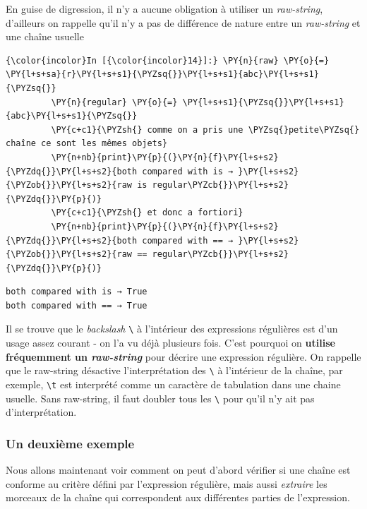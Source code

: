     En guise de digression, il n'y a aucune obligation à utiliser un
\emph{raw-string}, d'ailleurs on rappelle qu'il n'y a pas de différence
de nature entre un \emph{raw-string} et une chaîne usuelle

    \begin{Verbatim}[commandchars=\\\{\}]
{\color{incolor}In [{\color{incolor}14}]:} \PY{n}{raw} \PY{o}{=} \PY{l+s+sa}{r}\PY{l+s+s1}{\PYZsq{}}\PY{l+s+s1}{abc}\PY{l+s+s1}{\PYZsq{}}
         \PY{n}{regular} \PY{o}{=} \PY{l+s+s1}{\PYZsq{}}\PY{l+s+s1}{abc}\PY{l+s+s1}{\PYZsq{}}
         \PY{c+c1}{\PYZsh{} comme on a pris une \PYZsq{}petite\PYZsq{} chaîne ce sont les mêmes objets}
         \PY{n+nb}{print}\PY{p}{(}\PY{n}{f}\PY{l+s+s2}{\PYZdq{}}\PY{l+s+s2}{both compared with is → }\PY{l+s+s2}{\PYZob{}}\PY{l+s+s2}{raw is regular\PYZcb{}}\PY{l+s+s2}{\PYZdq{}}\PY{p}{)}
         \PY{c+c1}{\PYZsh{} et donc a fortiori}
         \PY{n+nb}{print}\PY{p}{(}\PY{n}{f}\PY{l+s+s2}{\PYZdq{}}\PY{l+s+s2}{both compared with == → }\PY{l+s+s2}{\PYZob{}}\PY{l+s+s2}{raw == regular\PYZcb{}}\PY{l+s+s2}{\PYZdq{}}\PY{p}{)}
\end{Verbatim}


    \begin{Verbatim}[commandchars=\\\{\}]
both compared with is → True
both compared with == → True

    \end{Verbatim}

    Il se trouve que le \emph{backslash} \texttt{\textbackslash{}} à
l'intérieur des expressions régulières est d'un usage assez courant - on
l'a vu déjà plusieurs fois. C'est pourquoi on \textbf{utilise
fréquemment un \emph{raw-string}} pour décrire une expression régulière.
On rappelle que le raw-string désactive l'interprétation des
\texttt{\textbackslash{}} à l'intérieur de la chaîne, par exemple,
\texttt{\textbackslash{}t} est interprété comme un caractère de
tabulation dans une chaine usuelle. Sans raw-string, il faut doubler
tous les \texttt{\textbackslash{}} pour qu'il n'y ait pas
d'interprétation.

    \hypertarget{un-deuxiuxe8me-exemple}{%
\subsubsection{Un deuxième exemple}\label{un-deuxiuxe8me-exemple}}

    Nous allons maintenant voir comment on peut d'abord vérifier si une
chaîne est conforme au critère défini par l'expression régulière, mais
aussi \emph{extraire} les morceaux de la chaîne qui correspondent aux
différentes parties de l'expression.\\


